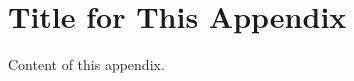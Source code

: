 
\cleardoublepage

\chapter{Title for This Appendix}
\label{Appendix:Key1}

Content of this appendix.


